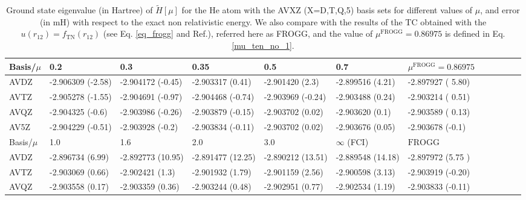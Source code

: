 \documentclass[aip,jcp,reprint,noshowkeys,superscriptaddress]{revtex4-1}
\newcommand{\frogg}[0]{\text{FROGG}}
\newcommand{\mfrogg}[0]{\mu^\text{FROGG}}
\begin{document}
\begin{table}
\label{table_conv_e_mu}
\caption{Ground state eigenvalue (in Hartree) of $\tilde{H}[\mu]$ for the He atom with the AVXZ (X=D,T,Q,5) basis sets for different values of $\mu$, and error (in mH) with respect to the exact non relativistic energy. 
We also compare with the results of the TC obtained with the $u(r_{12}) = f_{\text{TN}}(r_{12})$ (see Eq. \eqref{eq_frogg} and Ref.), referred here as FROGG, and the value of $\mfrogg=0.86975$ is defined in Eq. \eqref{mu_ten_no_1}. 
 }
\begin{ruledtabular}
\begin{tabular}{llllllllllll}
 Basis/$\mu$ & 0.2                   & 0.3                   & 0.35                  & 0.5                  & 0.7                 & $\mfrogg=0.86975$    \\
\hline                                                                                                                                                  
 AVDZ        &    -2.906309 (-2.58)  &    -2.904172 (-0.45)  &    -2.903317 (0.41)   &    -2.901420 (2.3)   &    -2.899516 (4.21) &  -2.897927 ( 5.80)    \\
 AVTZ        &    -2.905278 (-1.55)  &    -2.904691 (-0.97)  &    -2.904468 (-0.74)  &    -2.903969 (-0.24) &    -2.903488 (0.24) &  -2.903214 ( 0.51)    \\
 AVQZ        &    -2.904325 (-0.6)   &    -2.903986 (-0.26)  &    -2.903879 (-0.15)  &    -2.903702 (0.02)  &    -2.903620 (0.1)  &  -2.903589 ( 0.13)     \\
 AV5Z        &    -2.904229 (-0.51)  &    -2.903928 (-0.2)   &    -2.903834 (-0.11)  &    -2.903702 (0.02)  &    -2.903676 (0.05) &  -2.903678 (-0.1)     \\
\hline
 Basis/$\mu$ & 1.0                   & 1.6                   & 2.0                   & 3.0                  & $\infty$ (FCI)       &     $\frogg$        \\
\hline                                                                                                                                                   
 AVDZ        &    -2.896734 (6.99)   &    -2.892773 (10.95)  &    -2.891477 (12.25)  &    -2.890212 (13.51) &    -2.889548 (14.18) &    -2.897972 (5.75 )\\
 AVTZ        &    -2.903069 (0.66)   &    -2.902421 (1.3)    &    -2.901932 (1.79)   &    -2.901159 (2.56)  &    -2.900598 (3.13)  &    -2.903919 (-0.20)\\
 AVQZ        &    -2.903558 (0.17)   &    -2.903359 (0.36)   &    -2.903244 (0.48)   &    -2.902951 (0.77)  &    -2.902534 (1.19)  &    -2.903833 (-0.11)\\

\end{tabular}
\end{ruledtabular}
\end{table}
\end{document}
